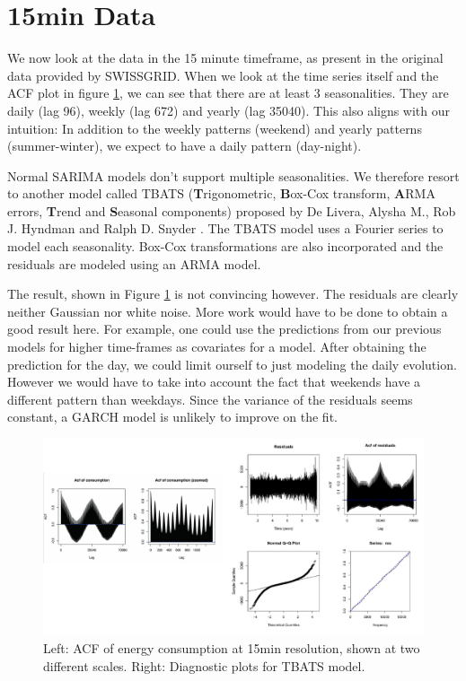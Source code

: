 \documentclass[conference]{IEEEtran}
\begin{document}
\section{15min Data}
We now look at the data in the 15 minute timeframe, as present in the original data provided by SWISSGRID. When we look at the time series itself and the ACF plot in figure \ref{fig8}, we can see that there are at least 3 seasonalities. They are daily (lag 96), weekly (lag 672) and yearly (lag 35040). This also aligns with our intuition: In addition to the weekly patterns (weekend) and yearly patterns (summer-winter), we expect to have a daily pattern (day-night).
\par
Normal SARIMA models don’t support multiple seasonalities. We therefore resort to another model called TBATS (\textbf{T}rigonometric, \textbf{B}ox-Cox transform, \textbf{A}RMA errors, \textbf{T}rend and \textbf{S}easonal components) proposed by De Livera, Alysha M., Rob J. Hyndman and Ralph D. Snyder \cite{TBATS_paper}. The TBATS model uses a Fourier series to model each seasonality. Box-Cox transformations are also incorporated and the residuals are modeled using an ARMA model.
\par
The result, shown in Figure \ref{fig8} is not convincing however. The residuals are clearly neither Gaussian nor white noise. More work would have to be done to obtain a good result here. For example, one could use the predictions from our previous models for higher time-frames as covariates for a model. After obtaining the prediction for the day, we could limit ourself to just modeling the daily evolution. However we would have to take into account the fact that weekends have a different pattern than weekdays. Since the variance of the residuals seems constant, a GARCH model is unlikely to improve on the fit.

\begin{figure}[ht]
	\centering
	\includegraphics[width=1\textwidth]{Figs/Fig8.pdf}
	\caption{Left: ACF of energy consumption at 15min resolution, shown at two different scales. Right: Diagnostic plots for TBATS model. }
	\label{fig8}
\end{figure}
\end{document}
